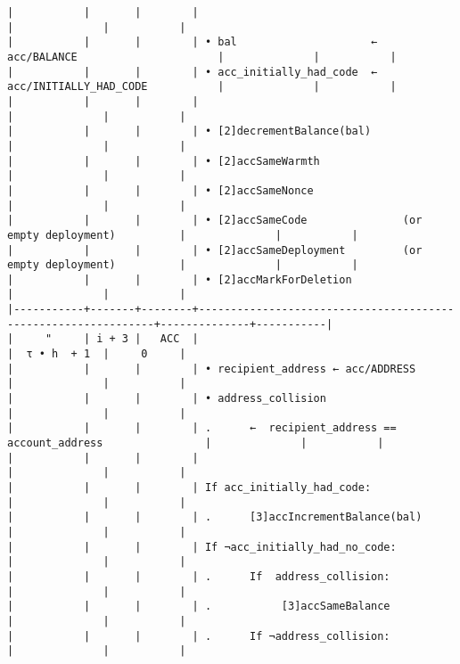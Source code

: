 \documentclass[varwidth=\maxdimen,margin=0.5cm,multi={verbatim}]{standalone}
\begin{document}
\begin{verbatim}
|           |       |        |                                                               |              |           |
|           |       |        | • bal                     ←  acc/BALANCE                      |              |           |
|           |       |        | • acc_initially_had_code  ←  acc/INITIALLY_HAD_CODE           |              |           |
|           |       |        |                                                               |              |           |
|           |       |        | • [2]decrementBalance(bal)                                    |              |           |
|           |       |        | • [2]accSameWarmth                                            |              |           |
|           |       |        | • [2]accSameNonce                                             |              |           |
|           |       |        | • [2]accSameCode               (or empty deployment)          |              |           |
|           |       |        | • [2]accSameDeployment         (or empty deployment)          |              |           |
|           |       |        | • [2]accMarkForDeletion                                       |              |           |
|-----------+-------+--------+---------------------------------------------------------------+--------------+-----------|
|     "     | i + 3 |   ACC  |                                                               |  τ • h  + 1  |     0     |
|           |       |        | • recipient_address ← acc/ADDRESS                             |              |           |
|           |       |        | • address_collision                                           |              |           |
|           |       |        | .      ←  recipient_address == account_address                |              |           |
|           |       |        |                                                               |              |           |
|           |       |        | If acc_initially_had_code:                                    |              |           |
|           |       |        | .      [3]accIncrementBalance(bal)                            |              |           |
|           |       |        | If ¬acc_initially_had_no_code:                                |              |           |
|           |       |        | .      If  address_collision:                                 |              |           |
|           |       |        | .           [3]accSameBalance                                 |              |           |
|           |       |        | .      If ¬address_collision:                                 |              |           |

\end{verbatim}
\end{document}

